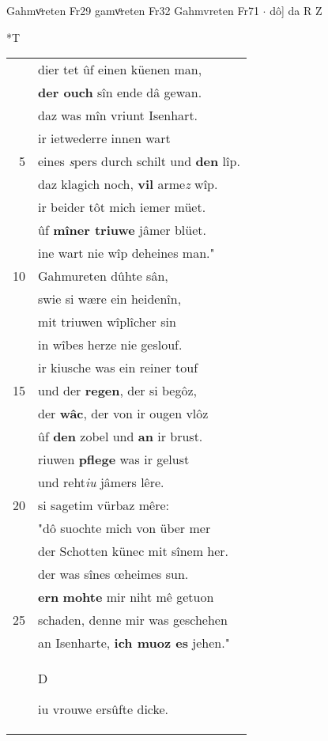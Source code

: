 \documentclass[8pt,a4paper,notitlepage]{article}
\begin{document}
\begin{table}[ht]
\begin{minipage}[t]{0.5\linewidth}
Gahmvͦreten Fr29 gamvͦreten Fr32 Gahmvreten Fr71  $\cdot$ dô] da R Z \newline
\end{minipage}
\hspace{0.5cm}
\begin{minipage}[t]{0.5\linewidth}
\small
\begin{center}*T
\end{center}
\begin{tabular}{rl}
 & dier tet ûf einen küenen man,\\ 
 & \textbf{der ouch} sîn ende dâ gewan.\\ 
 & daz was mîn vriunt Isenhart.\\ 
 & ir ietwederre innen wart\\ 
5 & eines \textit{s}pers durch schilt und \textbf{den} lîp.\\ 
 & daz klagich noch, \textbf{vil} arme\textit{z} wîp.\\ 
 & ir beider tôt mich iemer müet.\\ 
 & ûf \textbf{mîner triuwe} jâmer blüet.\\ 
 & ine wart nie wîp deheines man."\\ 
10 & Gahmureten dûhte sân,\\ 
 & swie si wære ein heidenîn,\\ 
 & mit triuwen wîplîcher sin\\ 
 & in wîbes herze nie geslouf.\\ 
 & ir kiusche was ein reiner touf\\ 
15 & und der \textbf{regen}, der si begôz,\\ 
 & der \textbf{wâc}, der von ir ougen vlôz\\ 
 & ûf \textbf{den} zobel und \textbf{an} ir brust.\\ 
 & riuwen \textbf{pflege} was ir gelust\\ 
 & und reht\textit{iu} jâmers lêre.\\ 
20 & si sagetim vürbaz mêre:\\ 
 & "dô suochte mich von über mer\\ 
 & der Schotten künec mit sînem her.\\ 
 & der was sînes œheimes sun.\\ 
 & \textbf{er}\textbf{n} \textbf{mohte} mir niht mê getuon\\ 
25 & schaden, denne mir was geschehen\\ 
 & an Isenharte, \textbf{ich muoz es} jehen."\\ 
 & \begin{large}D\end{large}iu vrouwe ersûfte dicke.\\ 

\end{tabular}
\end{minipage}
\end{table}
\end{document}
